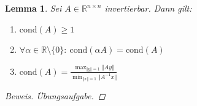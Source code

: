 \documentclass[12pt]{article}
\theoremstyle{break}
\newtheorem{lemma}[theorem]{Lemma}
\newtheorem{comment}[theorem]{Bemerkung}
\begin{document}

\begin{lemma}
Sei $A \in \mathbb{R}^{n \times n}$ invertierbar. Dann gilt:
\renewcommand{\labelenumi}{\roman{enumi})}
\begin{enumerate}
  \item $\text{cond}(A) \geq 1$
  \item $\forall \alpha \in \mathbb{R}\setminus \{0\}: \medspace \text{cond}(\alpha A) = \text{cond}(A)$
  \item $ \text{cond}(A) = \frac{\max_{\Vert y \Vert = 1} \Vert Ay \Vert}{\min_{\Vert x \Vert = 1} \Vert A^{-1}x \Vert}$
\end{enumerate}
\begin{proof}[Beweis]
Übungsaufgabe.
\end{proof}
\end{lemma}
\end{document}
